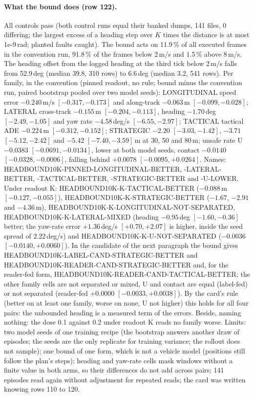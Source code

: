 \paragraph{What the bound does (row 122).} All controls pass (both control runs equal their banked dumps, 141 files, 0 differing; the largest excess of a heading step over $K$ times the distance is at most 1e-9\,rad; planted faults caught). The bound acts on 11.9\,\% of all executed frames in the convention run, 91.8\,\% of the frames below 2\,m/s and 1.5\,\% above 8\,m/s. The heading offset from the logged heading at the third tick below 2\,m/s falls from 52.9\,deg (median 39.8, 310 rows) to 6.6\,deg (median 3.2, 541 rows). Per family, in the convention (pinned readout, no rule; bound minus the convention run, paired bootstrap pooled over two model seeds): LONGITUDINAL speed error $-0.240$\,m/s $[-0.317,-0.173]$ and along-track $-0.063$\,m $[-0.099,-0.028]$; LATERAL cross-track $-0.155$\,m $[-0.204,-0.113]$, heading $-1.70$\,deg $[-2.49,-1.05]$ and yaw rate $-4.58$\,deg/s $[-6.55,-2.97]$; TACTICAL tactical ADE $-0.224$\,m $[-0.312,-0.152]$; STRATEGIC $-2.20$ $[-3.03,-1.42]$, $-3.71$ $[-5.12,-2.42]$ and $-5.42$ $[-7.40,-3.59]$\,m at 30, 50 and 80\,m; unsafe rate U $-0.0383$ $[-0.0691,-0.0134]$, lower at both model seeds, contact $-0.0140$ $[-0.0328,-0.0006]$, falling behind $+0.0078$ $[-0.0095,+0.0264]$. Names: HEADBOUND10K-PINNED-LONGITUDINAL-BETTER, -LATERAL-BETTER, -TACTICAL-BETTER, -STRATEGIC-BETTER and -U-LOWER. Under readout K: HEADBOUND10K-K-TACTICAL-BETTER ($-0.088$\,m $[-0.127,-0.055]$), HEADBOUND10K-K-STRATEGIC-BETTER ($-1.67$, $-2.91$ and $-4.36$\,m), HEADBOUND10K-K-LONGITUDINAL-NOT-SEPARATED, HEADBOUND10K-K-LATERAL-MIXED (heading $-0.95$\,deg $[-1.60,-0.36]$ better; the yaw-rate error $+1.36$\,deg/s $[+0.70,+2.07]$ is higher, inside the seed spread of 2.22\,deg/s) and HEADBOUND10K-K-U-NOT-SEPARATED ($-0.0036$ $[-0.0140,+0.0060]$). In the candidate of the next paragraph the bound gives HEADBOUND10K-LABEL-CAND-STRATEGIC-BETTER and HEADBOUND10K-READER-CAND-STRATEGIC-BETTER and, for the reader-fed form, HEADBOUND10K-READER-CAND-TACTICAL-BETTER; the other family cells are not separated or mixed, U and contact are equal (label-fed) or not separated (reader-fed $+0.0000$ $[-0.0033,+0.0038]$). By the card's rule (better on at least one family, worse on none, U not higher) this holds for all four pairs: the unbounded heading is a measured term of the  errors. Beside, naming nothing: the dose 0.1 against 0.2 under readout K reads no family worse. Limits: two model seeds of one training recipe (the bootstrap answers another draw of episodes; the seeds are the only replicate for training variance; the rollout does not sample); one bound of one form, which is not a vehicle model (positions still follow the plan's steps); heading and yaw-rate cells mask windows without a finite value in both arms, so their differences do not add across pairs; 141 episodes read again without adjustment for repeated reads; the card was written knowing rows 110 to 120.

